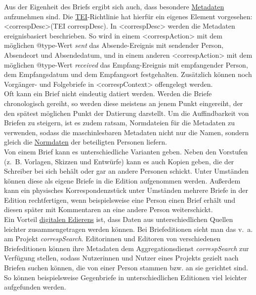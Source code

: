 \documentclass{article}
\begin{document}
        Aus der Eigenheit des Briefs ergibt sich auch, dass besondere \href{http://gams.uni-graz.at/o:konde.25}{Metadaten} aufzunehmen sind. Die \href{http://gams.uni-graz.at/o:konde.178}{TEI}-Richtlinie hat hierfür ein eigenes Element
                  vorgesehen: <correspDesc>(TEI correspDesc). In <correspDesc> werden die Metadaten ereignisbasiert beschrieben.
                  So wird in einem <correspAction> mit dem
                  möglichen @type-Wert \emph{sent} das
                  Absende-Ereignis mit sendender Person, Absendeort und Absendedatum, und in einem
                  anderen <correspAction> mit dem möglichen
                  @type-Wert \emph{received} das
                  Empfang-Ereignis mit empfangender Person, dem Empfangsdatum und dem Empfangsort
                  festgehalten. Zusätzlich können noch Vorgänger- und Folgebriefe in <correspContext> offengelegt werden.\\
            
        Oft kann ein Brief nicht eindeutig datiert werden. Werden die Briefe chronologisch
                  gereiht, so werden diese meistens an jenem Punkt eingereiht, der den spätest
                  möglichen Punkt der Datierung darstellt. Um die Auffindbarkeit von Briefen zu
                  steigern, ist es zudem ratsam, Normdateien für die Metadaten zu verwenden, sodass
                  die maschinlesbaren Metadaten nicht nur die Namen, sondern gleich die \href{http://gams.uni-graz.at/o:konde.147}{Normdaten} der beteiligten Personen
                  liefern.\\
            
        Von einem Brief kann es unterschiedliche Varianten geben. Neben den Vorstufen
                  (z. B. Vorlagen, Skizzen und Entwürfe) kann es auch Kopien geben, die der
                  Schreiber bei sich behält oder gar an andere Personen schickt. Unter Umständen
                  können diese als eigene Briefe in die Edition aufgenommen werden. Außerdem kann
                  ein physisches Korrespondenzstück unter Umständen mehrere Briefe in der Edition
                  rechtfertigen, wenn beispielsweise eine Person einen Brief erhält und diesen
                  später mit Kommentaren an eine andere Person weiterschickt.\\
            
        Ein Vorteil \href{http://gams.uni-graz.at/o:konde.59}{digitalen Edierens}
                  ist, dass Daten aus unterschiedlichen Quellen leichter zusammengetragen werden
                  können. Bei Briefeditionen sieht man das v. a. am Projekt \emph{correspSearch}. Editorinnen und Editoren von verschiedenen Briefeditionen
                  können ihre Metadaten dem Aggregationsdienst \emph{correspSearch}
                  zur Verfügung stellen, sodass Nutzerinnen und Nutzer eines Projekts gezielt nach
                  Briefen suchen können, die von einer Person stammen bzw. an sie gerichtet sind. So
                  können beispielsweise Gegenbriefe in unterschiedlichen Editionen viel leichter
                  aufgefunden werden.\\
            
\end{document}
